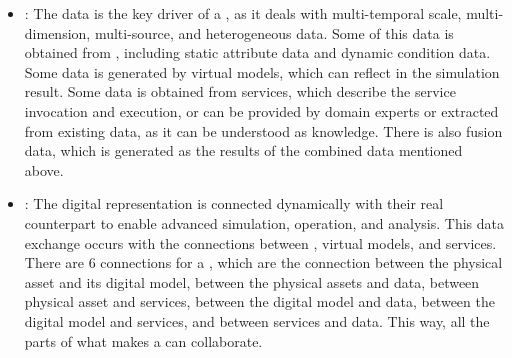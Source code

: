 \begin{itemize}
    \item \DD: The data is the key driver of a \DT, as it deals with multi-temporal scale, multi-dimension, multi-source, and heterogeneous data. Some of this data is obtained from \PEs, including static attribute data and dynamic condition data. Some data is generated by virtual models, which can reflect in the simulation result. Some data is obtained from services, which describe the service invocation and execution, or can be provided by domain experts or extracted from existing data, as it can be understood as knowledge. There is also fusion data, which is generated as the results of the combined data mentioned above.
    \item \CN: The digital representation is connected dynamically with their real counterpart to enable advanced simulation, operation, and analysis. This data exchange occurs with the connections between \PEs, virtual models, and services. There are 6 connections for a \DT, which are the connection between the physical asset and its digital model, between the physical assets and data, between physical asset and services, between the digital model and data,  between the digital model and services, and between services and data. This way, all the parts of what makes a \DT can collaborate.
\end{itemize}

